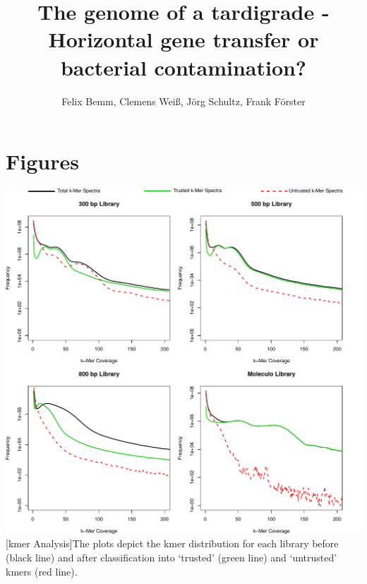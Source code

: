 \documentclass[12pt,a4paper]{scrartcl}
\title{\Large The genome of a tardigrade - \\\large Horizontal gene transfer or bacterial contamination?}
\author{\normalsize Felix Bemm, Clemens Weiß, Jörg Schultz, Frank Förster}
\date{}
\begin{document}
\maketitle

\pagebreak

\section{Figures}

\includegraphics[width=1\textwidth]{supplementary_figure_1}
[kmer Analysis]{The plots depict the kmer
  distribution for each library before (black line) and after
  classification into `trusted' (green line) and `untrusted' kmers
  (red line).}

\pagebreak
\end{document}
